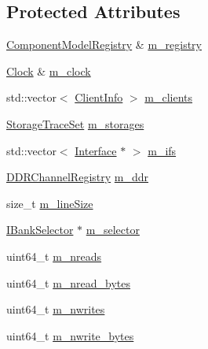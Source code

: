 \subsection*{Protected Attributes}
\begin{DoxyCompactItemize}
\item 
\hyperlink{class_component_model_registry}{Component\+Model\+Registry} \& \hyperlink{class_simulator_1_1_d_d_r_memory_a5c7ae6a98783750acfd99f473475d290}{m\+\_\+registry}
\item 
\hyperlink{class_simulator_1_1_clock}{Clock} \& \hyperlink{class_simulator_1_1_d_d_r_memory_a8a3027eccb3716453d542f17c4eb0151}{m\+\_\+clock}
\item 
std\+::vector$<$ \hyperlink{struct_simulator_1_1_d_d_r_memory_1_1_client_info}{Client\+Info} $>$ \hyperlink{class_simulator_1_1_d_d_r_memory_a1085d5517fc05585aca1462830c35266}{m\+\_\+clients}
\item 
\hyperlink{class_simulator_1_1_storage_trace_set}{Storage\+Trace\+Set} \hyperlink{class_simulator_1_1_d_d_r_memory_a978f278bcf563c6b0ff18d5da028d542}{m\+\_\+storages}
\item 
std\+::vector$<$ \hyperlink{class_simulator_1_1_d_d_r_memory_1_1_interface}{Interface} $\ast$ $>$ \hyperlink{class_simulator_1_1_d_d_r_memory_ab800a4733a5a57a894721260dc23182f}{m\+\_\+ifs}
\item 
\hyperlink{class_simulator_1_1_d_d_r_channel_registry}{D\+D\+R\+Channel\+Registry} \hyperlink{class_simulator_1_1_d_d_r_memory_a0c42aa5784100181ef6aa7e6cc4fc370}{m\+\_\+ddr}
\item 
size\+\_\+t \hyperlink{class_simulator_1_1_d_d_r_memory_adc20b7ea04f0bd71b1f9e07f9a8347d0}{m\+\_\+line\+Size}
\item 
\hyperlink{class_simulator_1_1_i_bank_selector}{I\+Bank\+Selector} $\ast$ \hyperlink{class_simulator_1_1_d_d_r_memory_ac9641b0d58bc819ae98172e599a4753e}{m\+\_\+selector}
\item 
uint64\+\_\+t \hyperlink{class_simulator_1_1_d_d_r_memory_a7a89625feeafa3ecdc0421b9495b9992}{m\+\_\+nreads}
\item 
uint64\+\_\+t \hyperlink{class_simulator_1_1_d_d_r_memory_ac0fed0a3fa10f29671ce4482cf5d61b8}{m\+\_\+nread\+\_\+bytes}
\item 
uint64\+\_\+t \hyperlink{class_simulator_1_1_d_d_r_memory_a0b1446411da9a506ad43e5622152ab3f}{m\+\_\+nwrites}
\item 
uint64\+\_\+t \hyperlink{class_simulator_1_1_d_d_r_memory_a5ad2606b3bb026608bcd7f6b42c56920}{m\+\_\+nwrite\+\_\+bytes}
\end{DoxyCompactItemize}
